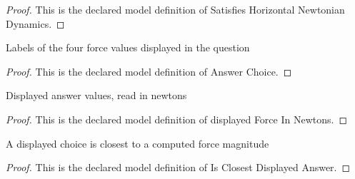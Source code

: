\begin{proof}
  This is the declared model definition of Satisfies Horizontal Newtonian Dynamics.
\end{proof}
\begin{definition}
  \label{def:physics:phyx-mini-0806:phyxminiproblems-problemphyxmini0806-answerchoice}
  Labels of the four force values displayed in the question
\end{definition}
\begin{proof}
  This is the declared model definition of Answer Choice.
\end{proof}
\begin{definition}
  \label{def:physics:phyx-mini-0806:phyxminiproblems-problemphyxmini0806-displayedforceinnewtons}
  Displayed answer values, read in newtons
\end{definition}
\begin{proof}
  This is the declared model definition of displayed Force In Newtons.
\end{proof}
\begin{definition}
  \label{def:physics:phyx-mini-0806:phyxminiproblems-problemphyxmini0806-isclosestdisplayedanswer}
  A displayed choice is closest to a computed force magnitude
\end{definition}
\begin{proof}
  This is the declared model definition of Is Closest Displayed Answer.
\end{proof}

